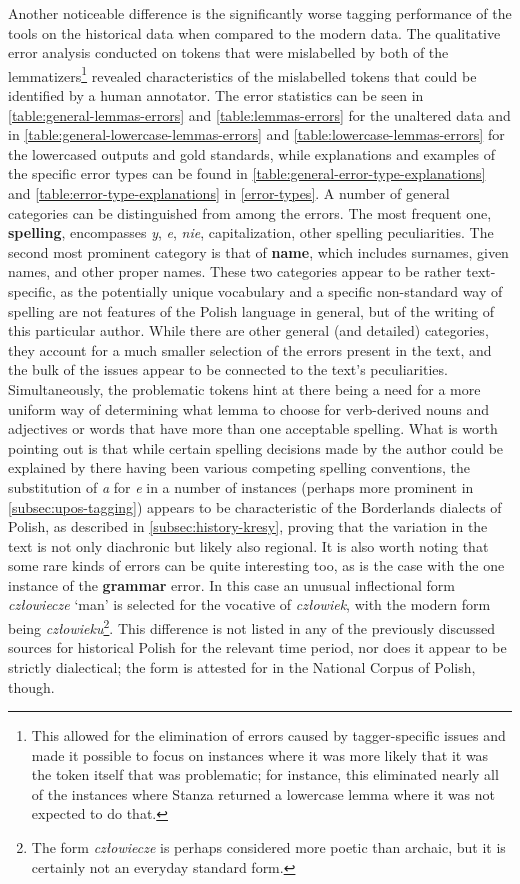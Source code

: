 Another noticeable difference is the significantly worse tagging performance of the tools on the historical data when compared to the modern data. The qualitative error analysis conducted on tokens that were mislabelled by both of the lemmatizers\footnote{This allowed for the elimination of errors caused by tagger-specific issues and made it possible to focus on instances where it was more likely that it was the token itself that was problematic; for instance, this eliminated nearly all of the instances where Stanza returned a lowercase lemma where it was not expected to do that.} revealed characteristics of the mislabelled tokens that could be identified by a human annotator. The error statistics can be seen in \autoref{table:general-lemmas-errors} and \autoref{table:lemmas-errors} for the unaltered data and in \autoref{table:general-lowercase-lemmas-errors} and \autoref{table:lowercase-lemmas-errors} for the lowercased outputs and gold standards, while explanations and examples of the specific error types can be found in \autoref{table:general-error-type-explanations} and \autoref{table:error-type-explanations} in \autoref{error-types}. A number of general categories can be distinguished from among the errors. The most frequent one, \textbf{spelling}, encompasses \textit{y}, \textit{e}, \textit{nie}, capitalization, other spelling peculiarities. The second most prominent category is that of \textbf{name}, which includes surnames, given names, and other proper names. These two categories appear to be rather text-specific, as the potentially unique vocabulary and a specific non-standard way of spelling are not features of the Polish language in general, but of the writing of this particular author. While there are other general (and detailed) categories, they account for a much smaller selection of the errors present in the text, and the bulk of the issues appear to be connected to the text's peculiarities. Simultaneously, the problematic tokens hint at there being a need for a more uniform way of determining what lemma to choose for verb-derived nouns and adjectives or words that have more than one acceptable spelling. What is worth pointing out is that while certain spelling decisions made by the author could be explained by there having been various competing spelling conventions, the substitution of \textit{a} for \textit{e} in a number of instances (perhaps more prominent in \autoref{subsec:upos-tagging}) appears to be characteristic of the Borderlands dialects of Polish, as described in \autoref{subsec:history-kresy}, proving that the variation in the text is not only diachronic but likely also regional. It is also worth noting that some rare kinds of errors can be quite interesting too, as is the case with the one instance of the \textbf{grammar} error. In this case an unusual inflectional form \textit{człowiecze} `man' is selected for the vocative of \textit{człowiek}, with the modern form being \textit{człowieku}\footnote{The form \textit{człowiecze} is perhaps considered more poetic than archaic, but it is certainly not an everyday standard form.}. This difference is not listed in any of the previously discussed sources for historical Polish for the relevant time period, nor does it appear to be strictly dialectical; the form is attested for in the National Corpus of Polish, though. 

